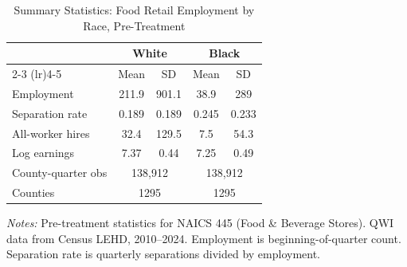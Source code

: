 \begin{table}[htbp]
\centering
\caption{Summary Statistics: Food Retail Employment by Race, Pre-Treatment}
\label{tab:sumstats}
\begin{tabular}{lcccc}
\toprule
 & \multicolumn{2}{c}{White} & \multicolumn{2}{c}{Black} \\
\cmidrule(lr){2-3} \cmidrule(lr){4-5}
 & Mean & SD & Mean & SD \\
\midrule
Employment & 211.9 & 901.1 & 38.9 & 289 \\
Separation rate & 0.189 & 0.189 & 0.245 & 0.233 \\
All-worker hires & 32.4 & 129.5 & 7.5 & 54.3 \\
Log earnings & 7.37 & 0.44 & 7.25 & 0.49 \\
\addlinespace
County-quarter obs & \multicolumn{2}{c}{138,912} & \multicolumn{2}{c}{138,912} \\
Counties & \multicolumn{2}{c}{1295} & \multicolumn{2}{c}{1295} \\
\bottomrule
\end{tabular}
\begin{tablenotes}
\item \textit{Notes:} Pre-treatment statistics for NAICS 445 (Food \& Beverage Stores).
QWI data from Census LEHD, 2010--2024. Employment is beginning-of-quarter count.
Separation rate is quarterly separations divided by employment.
\end{tablenotes}
\end{table}
